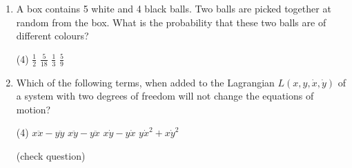 \begin{enumerate}
 \begin{tasks}(2)
	\task[\textbf{a.}] Positive $y$-direction
	\task[\textbf{b.}] Negative $z$ - direction
	\task[\textbf{c.}]Positive $z$ - direction
	\task[\textbf{d.}]  Negative $y$-direction
\end{tasks}
\item A box contains 5 white and 4 black balls. Two balls are picked together at random from the box. What is the probability that these two balls are of different colours?
 \begin{tasks}(4)
	\task[\textbf{a.}] $\frac{1}{2}$
	\task[\textbf{b.}]$\frac{5}{18}$
	\task[\textbf{c.}]$\frac{1}{3}$
	\task[\textbf{d.}]  $\frac{5}{9}$
\end{tasks}
\item Which of the following terms, when added to the Lagrangian $L(x, y, \dot{x}, \dot{y})$ of a system with two degrees of freedom will not change the equations of motion?
 \begin{tasks}(4)
	\task[\textbf{a.}]$x \ddot{x}-y \ddot{y}$
	\task[\textbf{b.}]$x \ddot{y}-y \ddot{x}$
	\task[\textbf{c.}]$x \dot{y}-y \dot{x}$
	\task[\textbf{d.}] $y \dot{x}^{2}+x \dot{y}^{2}$
\end{tasks}
(check question)	

\end{enumerate}
